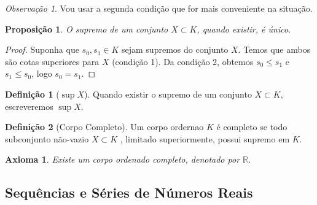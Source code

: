 \documentclass{article}
\theoremstyle{plain}
\newtheorem{axioma}{Axioma}
\newtheorem{prop}{Proposição}[section]
\theoremstyle{definition}
\newtheorem{definicao}{Definição}[section]
\theoremstyle{remark}
\newtheorem{obs}{Observação}[section]
\begin{document}
\begin{obs}
	Vou usar a segunda condição que for mais conveniente na situação.
\end{obs}
\begin{prop}
	O supremo de um conjunto $X\subset K$, quando existir, é único.
\end{prop}
\begin{proof}
	Suponha que $s_0,s_1\in K$ sejam supremos do conjunto $X$. Temos que ambos são cotas superiores para $X$ (condição 1). Da condição 2, obtemos $s_0 \leq s_1$ e $s_1\leq s_0$, logo $s_0 = s_1$.
\end{proof}
\begin{definicao}[$\sup X$]
	Quando existir o supremo de um conjunto $X\subset K$, escreveremos $\sup X$.
\end{definicao}
\begin{definicao}[Corpo Completo]
	Um corpo ordernao $K$ é completo se todo subconjunto não-vazio $X\subset K$ , limitado superiormente, possui supremo em $K$.
\end{definicao}
\begin{axioma}
	Existe um corpo ordenado completo, denotado por $\mathbb{R}$.
\end{axioma}
\subsection{ Sequências e Séries de Números Reais}
\end{document}
